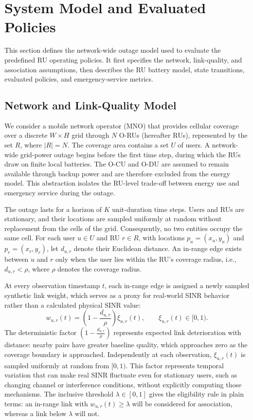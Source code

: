 \section{System Model and Evaluated Policies}
\label{sec:system-model}

This section defines the network-wide outage model used to evaluate the predefined RU operating policies. It first specifies the network, link-quality, and association assumptions, then describes the RU battery model, state transitions, evaluated policies, and emergency-service metrics.

\subsection{Network and Link-Quality Model}

We consider a mobile network operator (MNO) that provides cellular coverage over a discrete \(W\times H\) grid through \(N\) O-RUs (hereafter RUs), represented by the set \(R\), where \(|R|=N\). The coverage area contains a set \(U\) of users. A network-wide grid-power outage begins before the first time step, during which the RUs draw on finite local batteries. The O-CU and O-DU are assumed to remain available through backup power and are therefore excluded from the energy model. This abstraction isolates the RU-level trade-off between energy use and emergency service during the outage.

The outage lasts for a horizon of \(K\) unit-duration time steps. Users and RUs are stationary, and their locations are sampled uniformly at random without replacement from the cells of the grid. Consequently, no two entities occupy the same cell. For each user \(u\in U\) and RU \(r\in R\), with locations \(p_u=(x_u,y_u)\) and \(p_r=(x_r,y_r)\), let \(d_{u,r}\) denote their Euclidean distance. An in-range edge exists between \(u\) and \(r\) only when the user lies within the RU's coverage radius, i.e., \(d_{u,r}<\rho\), where \(\rho\) denotes the coverage radius.

At every observation timestamp \(t\), each in-range edge is assigned a newly sampled synthetic link weight, which serves as a proxy for real-world SINR behavior rather than a calculated physical SINR value:
\begin{equation}
 w_{u,r}(t)=\left(1-\frac{d_{u,r}}{\rho}\right)\xi_{u,r}(t),
 \qquad \xi_{u,r}(t)\in[0,1).
 \label{eq:link-quality}
\end{equation}
The deterministic factor \((1-\frac{d_{u,r}}{\rho})\) represents expected link deterioration with distance: nearby pairs have greater baseline quality, which approaches zero as the coverage boundary is approached.  Independently at each observation, \(\xi_{u,r}(t)\) is sampled uniformly at random from \([0,1)\).  This factor represents temporal variation that can make real SINR fluctuate even for stationary users, such as changing channel or interference conditions, without explicitly computing those mechanisms.  The inclusive threshold \(\lambda\in[0,1]\) gives the eligibility rule in plain terms: an in-range link with \(w_{u,r}(t)\geq\lambda\) will be considered for association, whereas a link below \(\lambda\) will not.

